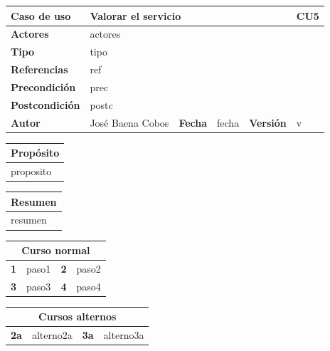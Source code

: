 \documentclass[12pt,spanish]{article}
\begin{document}
\begin{table}[H]
\centering
\begin{tabular}{|m{3cm}|m{4cm}|m{2cm}|m{2cm}|m{2cm}|m{1cm}|}
\hline
\textbf{Caso de uso} &  \multicolumn{4}{m{8cm}|}{Valorar el servicio} \vline &  \cellcolor{gray!40}CU5 \\
\hline
\textbf{Actores} & \multicolumn{5}{m{8cm}|}{actores} \\
\hline
\textbf{Tipo} & \multicolumn{5}{m{8cm}|}{tipo} \\
\hline
\textbf{Referencias} &\multicolumn{5}{m{8cm}|}{ref} \\
\hline
\textbf{Precondición} & \multicolumn{5}{m{8cm}|}{prec} \\
\hline
\textbf{Postcondición} & \multicolumn{5}{m{8cm}|}{postc} \\
\hline
\textbf{Autor} & José Baena Cobos & \textbf{Fecha} & fecha & \textbf{Versión} & v \\
\hline
\end{tabular}

\vspace{1cm}

\begin{tabular}{|m{16.2cm}|}
\hline
\textbf{Propósito} \\
\hline
proposito \\
\hline
\end{tabular}

\vspace{1cm}

\begin{tabular}{|m{16.2cm}|}
\hline
\textbf{Resumen} \\
\hline
resumen \\
\hline
\end{tabular}

\vspace{1cm}

\begin{tabular}{|m{4pt}|m{7.33cm}|m{4pt}|m{7.33cm}|}
\hline
\multicolumn{4}{|c|}{\textbf{Curso normal}} \\
\hline
\textbf{1} & paso1 & \textbf{2} & paso2 \\
\hline
\textbf{3} & paso3 & \textbf{4} & paso4 \\
\hline
\end{tabular}

\vspace{1cm}

\begin{tabular}{|m{10pt}|m{7.15cm}|m{10pt}|m{7.15cm}|}
\hline
\multicolumn{4}{|c|}{\textbf{Cursos alternos}} \\
\hline
\textbf{2a} & alterno2a & \textbf{3a} & alterno3a  \\
\hline
\end{tabular}


\end{table}
\end{document}
